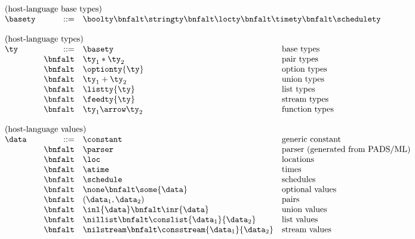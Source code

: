 \begin{figure*}[t]
\[
\begin{array}{lrll}
\multicolumn{4}{l}{\mbox{(host-language base types)}}\\ 
\basety & ::= & \multicolumn{2}{l}{\boolty \bnfalt \stringty \bnfalt \locty \bnfalt \timety \bnfalt \schedulety} \\
\\
\multicolumn{4}{l}{\mbox{(host-language types)}}\\ 
\ty & ::= & \basety & \mbox{base types} \\
 & \bnfalt & \ty_1 * \ty_2 & \mbox{pair types} \\
 & \bnfalt & \optionty{\ty} & \mbox{option types}\\
 & \bnfalt & \ty_1 + \ty_2 & \mbox{union types} \\
 & \bnfalt & \listty{\ty} & \mbox{list types}\\
 & \bnfalt & \feedty{\ty} & \mbox{stream types}\\
 & \bnfalt & \ty_1 \arrow \ty_2 & \mbox{function types} \\
\\
\multicolumn{4}{l}{\mbox{(host-language values)}}\\ 
\data & ::=     & \constant & \mbox{generic constant} \\
 & \bnfalt & \parser & \mbox{parser (generated from PADS/ML)} \\
 & \bnfalt & \loc & \mbox{locations} \\
 & \bnfalt & \atime & \mbox{times} \\
 & \bnfalt & \schedule & \mbox{schedules} \\
 & \bnfalt & \none \bnfalt 
                           \some{\data} & \mbox{optional values}\\
 & \bnfalt & (\data_1,\data_2) & \mbox{pairs} \\
 & \bnfalt & \inl{\data} \bnfalt 
                           \inr{\data} & \mbox{union values} \\
 & \bnfalt & \nillist \bnfalt 
                           \conslist{\data_1}{\data_2} & \mbox{list values} \\
 & \bnfalt & \nilstream \bnfalt 
                           \consstream{\data_1}{\data_2} & \mbox{stream values} \\


\end{array}\]
\end{figure*}
